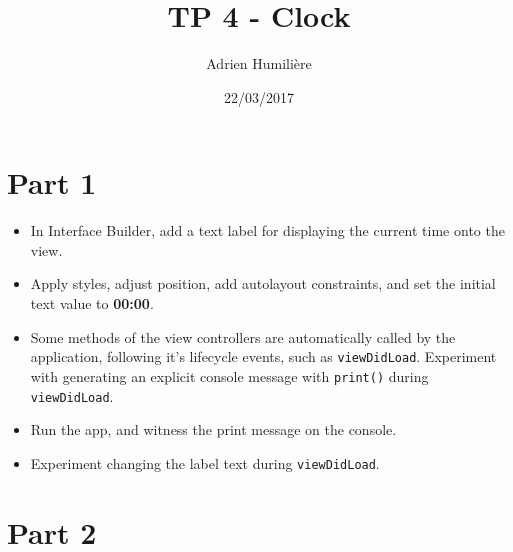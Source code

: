 \documentclass[a4paper,11pt]{scrartcl}
\begin{document}
\newcommand{\mytitle}{TP 4 - Clock}
\title{\mytitle}
\author{Adrien Humilière}
\date{22/03/2017}

\maketitle

\section*{Part 1}

\begin{itemize}
\item In Interface Builder, add a text label for displaying the current time onto the view.
\item Apply styles, adjust position, add autolayout constraints, and set the initial text value to \textbf{00:00}.
\item Some methods of the view controllers are automatically called by the application, following it's lifecycle events, such as \texttt{viewDidLoad}. Experiment with generating an explicit console message with \texttt{print()} during \texttt{viewDidLoad}.
\item Run the app, and witness the print message on the console.
\item Experiment changing the label text during \texttt{viewDidLoad}.
\end{itemize}

\section*{Part 2}
\end{document}
